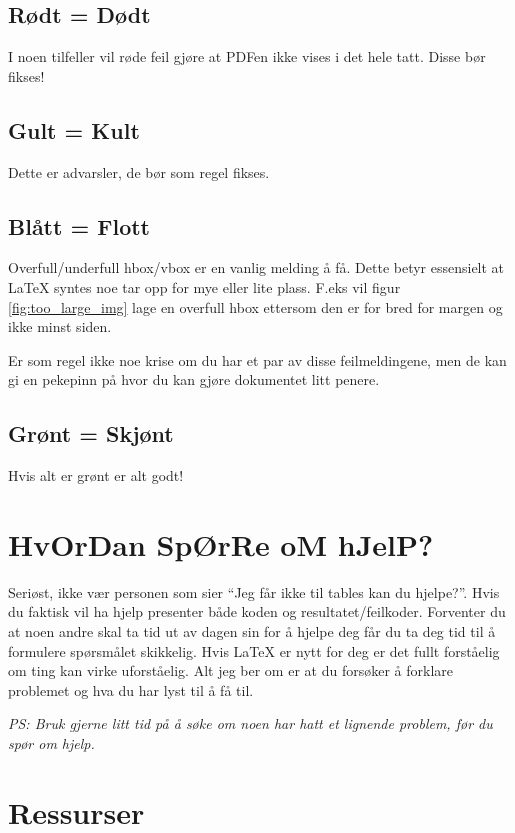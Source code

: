     \subsection{Rødt = Dødt}
        I noen tilfeller vil røde feil gjøre at PDFen ikke vises i det hele tatt. Disse bør fikses!
    \subsection{Gult = Kult}
        Dette er advarsler, de bør som regel fikses. 
    \subsection{Blått = Flott}
        Overfull/underfull hbox/vbox er en vanlig melding å få. Dette betyr essensielt at \LaTeX{} syntes noe tar opp for mye eller lite plass. F.eks vil figur \ref{fig:too_large_img} lage en overfull hbox ettersom den er for bred for margen og ikke minst siden. 
        
        Er som regel ikke noe krise om du har et par av disse feilmeldingene, men de kan gi en pekepinn på hvor du kan gjøre dokumentet litt penere.
    \subsection{Grønt = Skjønt}
        Hvis alt er grønt er alt godt!



\section{HvOrDan SpØrRe oM hJelP?}
    Seriøst, ikke vær personen som sier ``Jeg får ikke til tables kan du hjelpe?''. 
    Hvis du faktisk vil ha hjelp presenter både koden og resultatet/feilkoder.
    Forventer du at noen andre skal ta tid ut av dagen sin for å hjelpe deg får du ta deg tid til å formulere spørsmålet skikkelig. Hvis \LaTeX{} er nytt for deg er det fullt forståelig om ting kan virke uforståelig. Alt jeg ber om er at du forsøker å forklare problemet og hva du har lyst til å få til.
    
    \textit{PS: Bruk gjerne litt tid på å søke om noen har hatt et lignende problem, før du spør om hjelp.}

\section{Ressurser}
    

